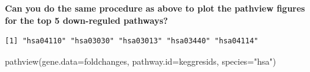 \documentclass[
  letterpaper,
  DIV=11,
  numbers=noendperiod]{scrartcl}
\newenvironment{Shaded}{\begin{snugshade}}{\end{snugshade}}
\newcommand{\AttributeTok}[1]{\textcolor[rgb]{0.40,0.45,0.13}{#1}}
\newcommand{\CommentTok}[1]{\textcolor[rgb]{0.37,0.37,0.37}{#1}}
\newcommand{\DecValTok}[1]{\textcolor[rgb]{0.68,0.00,0.00}{#1}}
\newcommand{\DocumentationTok}[1]{\textcolor[rgb]{0.37,0.37,0.37}{\textit{#1}}}
\newcommand{\FunctionTok}[1]{\textcolor[rgb]{0.28,0.35,0.67}{#1}}
\newcommand{\NormalTok}[1]{\textcolor[rgb]{0.00,0.23,0.31}{#1}}
\newcommand{\OtherTok}[1]{\textcolor[rgb]{0.00,0.23,0.31}{#1}}
\newcommand{\SpecialCharTok}[1]{\textcolor[rgb]{0.37,0.37,0.37}{#1}}
\newcommand{\StringTok}[1]{\textcolor[rgb]{0.13,0.47,0.30}{#1}}
\begin{document}
\textbf{Can you do the same procedure as above to plot the pathview
figures for the top 5 down-reguled pathways?}

\begin{Shaded}
\end{Shaded}

\begin{verbatim}
[1] "hsa04110" "hsa03030" "hsa03013" "hsa03440" "hsa04114"
\end{verbatim}

\begin{Shaded}
\begin{Highlighting}[]
\FunctionTok{pathview}\NormalTok{(}\AttributeTok{gene.data=}\NormalTok{foldchanges, }\AttributeTok{pathway.id=}\NormalTok{keggresids, }\AttributeTok{species=}\StringTok{"hsa"}\NormalTok{)}
\end{Highlighting}
\end{Shaded}
\end{document}
